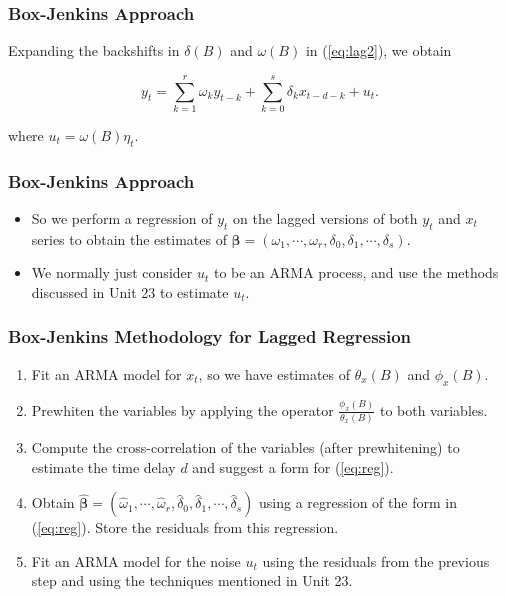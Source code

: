 \documentclass[%
xcolor=pdftex]{beamer}
\begin{document}
\begin{frame}
\frametitle{Box-Jenkins Approach}

Expanding the backshifts in $\delta(B)$ and $\omega(B)$ in (\ref{eq:lag2}), we obtain

\begin{equation} \label{eq:reg}
y_t = \sum_{k=1}^r \omega_k y_{t-k} + \sum_{k=0}^s \delta_k x_{t-d-k} + u_t.
\end{equation}

where $u_t = \omega(B)\eta_t$. \\

\end{frame}

\begin{frame}
\frametitle{Box-Jenkins Approach}

\begin{itemize}
\item So we perform a regression of $y_t$ on the lagged versions of both $y_t$ and $x_t$ series to obtain the estimates of $\boldsymbol{\beta} = (\omega_1, \cdots, \omega_r, \delta_0, \delta_1, \cdots, \delta_s)$.
\item We normally just consider $u_t$ to be an ARMA process, and use the methods discussed in Unit 23 to estimate $u_t$.
\end{itemize}

\end{frame}


\begin{frame}
\frametitle{Box-Jenkins Methodology for Lagged Regression}

\begin{enumerate}

\item Fit an ARMA model for $x_t$, so we have estimates of $\theta_x(B)$ and $\phi_x(B)$.
\item Prewhiten the variables by applying the operator $\frac{\phi_x(B)}{\theta_x(B)}$ to both variables.
\item Compute the cross-correlation of the variables (after prewhitening) to estimate the time delay $d$ and suggest a form for (\ref{eq:reg}).
\item Obtain $\boldsymbol{\hat{\beta}} = (\hat{\omega}_1, \cdots, \hat{\omega}_r, \hat{\delta}_0, \hat{\delta}_1, \cdots, \hat{\delta}_s)$ using a regression of the form in (\ref{eq:reg}). Store the residuals from this regression.
\item Fit an ARMA model for the noise $u_t$ using the residuals from the previous step and using the techniques mentioned in Unit 23. 

\end{enumerate}

\end{frame}
\end{document}
